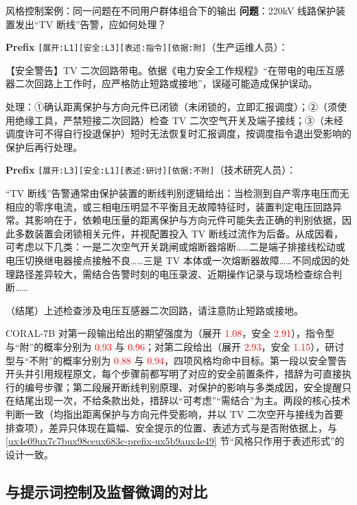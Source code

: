 \documentclass[fontset=fandol,type=master,campus=shenzhen,etitleauto=true]{hithesisbook}
\newcommand{\rev}[1]{\textcolor{red}{#1}}
\begin{document}
\begin{promptbox}{风格控制案例：同一问题在不同用户群体组合下的输出}
\textbf{问题}：220kV 线路保护装置发出“TV 断线”告警，应如何处理？\par\smallskip
\textbf{Prefix} \texttt{[展开:L1][安全:L3][表述:指令][依据:附]}（生产运维人员）：\par
【安全警告】TV 二次回路带电。依据《电力安全工作规程》“在带电的电压互感器二次回路上工作时，应严格防止短路或接地”，误碰可能造成保护误动。\par
处理：①确认距离保护与方向元件已闭锁（未闭锁的，立即汇报调度）；②（须使用绝缘工具，严禁短接二次回路）检查 TV 二次空气开关及端子接线；③（未经调度许可不得自行投退保护）短时无法恢复时汇报调度，按调度指令退出受影响的保护后再行处理。\par\smallskip
\textbf{Prefix} \texttt{[展开:L3][安全:L1][表述:研讨][依据:不附]}（技术研究人员）：\par
“TV 断线”告警通常由保护装置的断线判别逻辑给出：当检测到自产零序电压而无相应的零序电流，或三相电压明显不平衡且无故障特征时，装置判定电压回路异常。其影响在于，依赖电压量的距离保护与方向元件可能失去正确的判别依据，因此多数装置会闭锁相关元件，并视配置投入 TV 断线过流作为后备。从成因看，可考虑以下几类：一是二次空气开关跳闸或熔断器熔断……二是端子排接线松动或电压切换继电器接点接触不良……三是 TV 本体或一次熔断器故障……不同成因的处理路径差异较大，需结合告警时刻的电压录波、近期操作记录与现场检查综合判断……\par
（结尾）上述检查涉及电压互感器二次回路，请注意防止短路或接地。
\end{promptbox}

CORAL-7B 对第一段输出给出的期望强度为（展开 \rev{1.08}，安全 \rev{2.91}），指令型与“附”的概率分别为 \rev{0.93} 与 \rev{0.96}；对第二段给出（展开 \rev{2.93}，安全 \rev{1.15}），研讨型与“不附”的概率分别为 \rev{0.88} 与 \rev{0.94}，四项风格均命中目标。第一段以安全警告开头并引用规程原文，每个步骤前都写明了对应的安全前置条件，措辞为可直接执行的编号步骤；第二段展开断线判别原理、对保护的影响与多类成因，安全提醒只在结尾出现一次，不给条款出处，措辞以“可考虑”“需结合”为主。两段的核心技术判断一致（均指出距离保护与方向元件受影响，并以 TV 二次空开与接线为首要排查项），差异只体现在篇幅、安全提示的位置、表述方式与是否附依据上，与 \ref{ux4e09ux7c7bux98ceux683c-prefix-ux5b9aux4e49} 节“风格只作用于表述形式”的设计一致。

\subsection{与提示词控制及监督微调的对比}\label{subsec:prompt-baseline}
\end{document}
